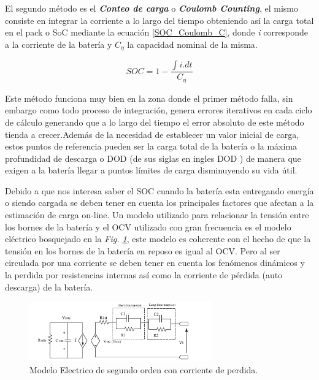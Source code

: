 \documentclass[10pt,a4paper]{article}
\begin{document}
El segundo método es el \textbf{\emph{Conteo de carga}} o \textbf{\emph{Coulomb
Counting}}, el mismo consiste en integrar la corriente a lo largo del tiempo
obteniendo así la carga total en el pack o SoC mediante la ecuación
\ref{SOC_Coulomb_C}, donde \emph{i} corresponde a la corriente de la batería y
$C_\eta$ la capacidad nominal de la misma.

\begin{equation}
    SOC=1-\frac{\int{i.dt}}{C_\eta}
    \label{SOC_Coulomb_C}
\end{equation}	

Este método funciona muy bien en la zona donde el primer método falla, sin
embargo como todo proceso de integración, genera errores iterativos en cada
ciclo de cálculo generando que a lo largo del tiempo el error absoluto de este
método tienda a crecer.Además de la necesidad de establecer un valor inicial de
carga, estos puntos de referencia pueden ser la carga total de la batería o la
máxima profundidad de descarga o DOD (de sus siglas en ingles \acrfull{DOD} ) de
manera que exigen a la batería llegar a puntos límites de carga disminuyendo su
vida útil.

Debido a que nos interesa saber el \acrshort{SOC} cuando la batería esta
entregando energía o siendo cargada se deben tener en cuenta los principales
factores que afectan a la estimación de carga on-line. Un modelo utilizado para
relacionar la tensión entre los bornes de la batería y el \acrshort{OCV}
utilizado con gran frecuencia es el modelo eléctrico bosquejado en la \emph{Fig.
\ref{Electric_model}}, este modelo es coherente con el hecho de que la tensión
en los bornes de la batería en reposo es igual al \acrshort{OCV}. Pero al ser
circulada por una corriente se deben tener en cuenta los fenómenos dinámicos  y
la perdida por resistencias internas así como la corriente de pérdida (auto
descarga) de la batería.

\begin{figure}[h!]
    \begin{center}
	\includegraphics[width=0.7\textwidth]{electric_battery_model_2_order.png}
	\caption{Modelo Electrico de segundo orden con corriente de perdida.}
	\label{Electric_model}
    \end{center}
\end{figure}
\end{document}
